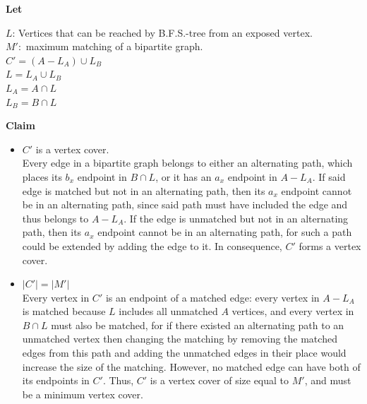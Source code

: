 \documentclass[twoside]{article}
\begin{document}
\begin{minipage}{0.6\textwidth}
\textbf{Let}


$L$: Vertices that can be reached by B.F.S.-tree from an exposed vertex.\\

$M' : $ maximum matching of a bipartite graph.\\

$C' = (A-L_A)\cup L_B $\\

$L = L_A \cup L_B$\\
$L_A = A \cap L$\\
$L_B = B \cap L$

\vspace{10mm}
\textbf{Claim}\\
\begin{itemize}
\item $C'$ is a vertex cover.\\
Every edge in a bipartite graph belongs to either an alternating path, which places its $b_x$ endpoint in $B \cap L$, or it has an $a_x$ endpoint in $A-L_A$. If said edge is matched but not in an alternating path, then its $a_x$ endpoint cannot be in an alternating path, since said path must have included the edge and thus belongs to $A-L_A$. If the edge is unmatched but not in an alternating path, then its $a_x$ endpoint cannot be in an alternating path, for such a path could be extended by adding the edge to it. In consequence, $C'$ forms a vertex cover.
\item $|C'| = |M'|$\\
Every vertex in $C'$ is an endpoint of a matched edge: every vertex in $A-L_A$ is matched because $L$ includes all unmatched $A$ vertices, and every vertex in $B \cap L$ must also be matched, for if there existed an alternating path to an unmatched vertex then changing the matching by removing the matched edges from this path and adding the unmatched edges in their place would increase the size of the matching. However, no matched edge can have both of its endpoints in $C'$. Thus, $C'$ is a vertex cover of size equal to $M'$, and must be a minimum vertex cover.
\end{itemize}


\end{minipage}
\end{document}
